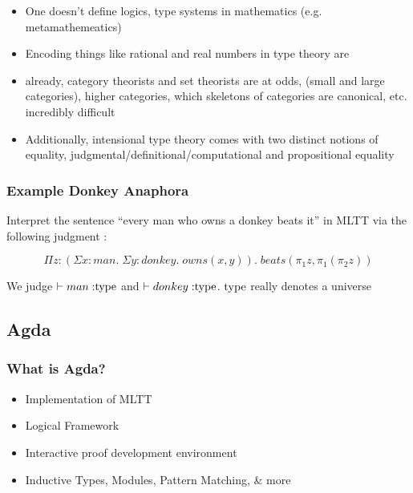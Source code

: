 \documentclass[10pt]{beamer}
\begin{document}
\begin{frame}

\begin{itemize}
\item One doesn't define logics, type systems in mathematics (e.g. metamathemeatics)
\item Encoding things like rational and real numbers in type theory are
\item already, category theorists and set theorists are at odds, (small and
  large categories), higher categories, which skeletons of categories are canonical, etc.
  incredibly difficult
\item Additionally, intensional type theory comes with two distinct notions of
  equality, judgmental/definitional/computational and propositional equality
\end{itemize}
\end{frame}

\begin{frame}

\frametitle{Example Donkey Anaphora}

Interpret the sentence ``every man who owns a donkey beats it'' in MLTT via the following judgment :

\[\Pi z : (\Sigma x : man. \; \Sigma y : donkey. \; owns(x,y)). \;
  beats(\pi_1z,\pi_1(\pi_2z))\]

We judge $\vdash man \; {:} {\rm type}$ and $\vdash donkey \; {:}
{\rm type}$. ${\rm type}$ really denotes a universe

\end{frame}

\subsection{Agda}

\begin{frame}
\frametitle{What is Agda?}

\begin{itemize}
\item Implementation of MLTT
\item Logical Framework
\item Interactive proof development environment
\item Inductive Types, Modules, Pattern Matching, & more
\end{itemize}

\end{frame}
\end{document}
